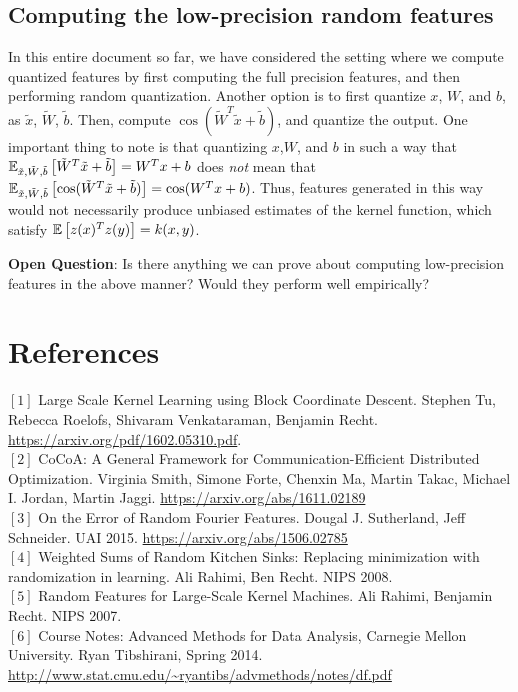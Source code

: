 \documentclass[12pt]{article}
\newcommand{\sq}{\sqrt{2}}
\newcommand{\tx}{\tilde{x}}
\newcommand{\tW}{\tilde{W}}
\newcommand{\tb}{\tilde{b}}
\newcommand{\teps}{\tilde{\epsilon}}
\newcommand{\tS}{\tilde{S}}
\begin{document}
\subsection{Computing the low-precision random features}
In this entire document so far, we have considered the setting where we compute quantized features by first computing the full precision features, and then performing random quantization.  Another option is to 
first quantize $x$, $W$, and $b$, as $\tx$, $\tW$, $\tb$.  Then, compute $\cos(\tW^T \tx + \tb)$, and quantize the output.
One important thing to note is that quantizing $x$,$W$, and $b$ in such a way that $\expect{\tx,\tW,\tb}{\tW^T\tx + \tb} = W^Tx+b$ does \textit{not} mean that $\expect{\tx,\tW,\tb}{\cos(\tW^T\tx + \tb)} = \cos(W^Tx + b)$.  Thus, features generated in this way would not necessarily produce unbiased estimates of the kernel function, which satisfy $\expect{}{z(x)^Tz(y)} = k(x,y)$.

\noindent \textbf{Open Question}: Is there anything we can prove about computing low-precision features in the above manner? Would they perform well empirically?



\section{References}
\noindent$[1]$ Large Scale Kernel Learning using Block Coordinate Descent.
Stephen Tu, Rebecca Roelofs, Shivaram Venkataraman, Benjamin Recht. \url{https://arxiv.org/pdf/1602.05310.pdf}. \\
$[2]$ CoCoA: A General Framework for Communication-Efficient Distributed Optimization.
Virginia Smith, Simone Forte, Chenxin Ma, Martin Takac, Michael I. Jordan, Martin Jaggi.  \url{https://arxiv.org/abs/1611.02189} \\
$[3]$ On the Error of Random Fourier Features. Dougal J. Sutherland, Jeff Schneider. UAI 2015. \url{https://arxiv.org/abs/1506.02785}\\
$[4]$ Weighted Sums of Random Kitchen Sinks: Replacing minimization with randomization in learning. Ali Rahimi, Ben Recht. NIPS 2008.\\
$[5]$	Random Features for Large-Scale Kernel Machines. Ali Rahimi, Benjamin Recht. NIPS 2007.\\
$[6]$  Course Notes: Advanced Methods for Data Analysis, Carnegie Mellon University.  Ryan Tibshirani, Spring 2014. \url{http://www.stat.cmu.edu/~ryantibs/advmethods/notes/df.pdf}
\end{document}
